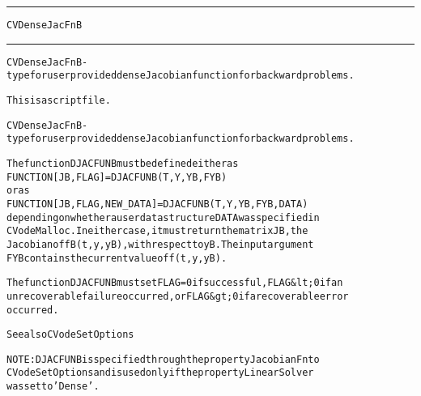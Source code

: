\begin{samepage}
\hrule
\begin{center}
{\large \verb!CVDenseJacFnB!}
\label{p:CVDenseJacFnB}
\end{center}
\hrule\vspace{0.1in}



\begin{alltt}
CVDenseJacFnB - type for user provided dense Jacobian function for backward problems.
\end{alltt}

\end{samepage}



\begin{samepage}


\begin{alltt}
This is a script file. 
\end{alltt}

\end{samepage}



\begin{alltt}
CVDenseJacFnB - type for user provided dense Jacobian function for backward problems.

   The function DJACFUNB must be defined either as
        FUNCTION [JB, FLAG] = DJACFUNB(T, Y, YB, FYB)
   or as
        FUNCTION [JB, FLAG, NEW_DATA] = DJACFUNB(T, Y, YB, FYB, DATA)
   depending on whether a user data structure DATA was specified in
   CVodeMalloc. In either case, it must return the matrix JB, the
   Jacobian of fB(t,y,yB), with respect to yB. The input argument
   FYB contains the current value of f(t,y,yB).

   The function DJACFUNB must set FLAG=0 if successful, FLAG&lt;0 if an
   unrecoverable failure occurred, or FLAG&gt;0 if a recoverable error
   occurred.

   See also CVodeSetOptions

   NOTE: DJACFUNB is specified through the property JacobianFn to
   CVodeSetOptions and is used only if the property LinearSolver
   was set to 'Dense'.
\end{alltt}






\vspace{0.1in}